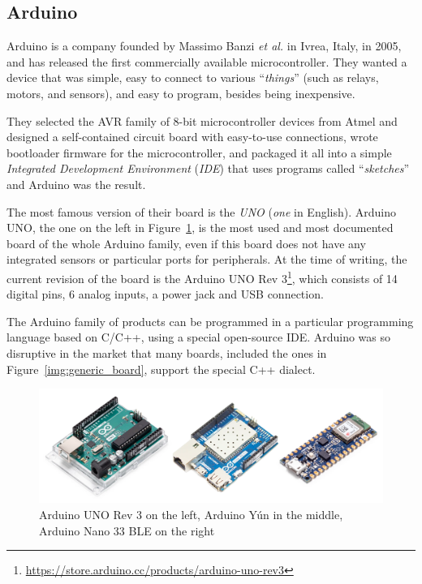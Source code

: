 		\subsection{Arduino}\label{subsec:arduino}
		
			Arduino is a company founded by Massimo Banzi \textit{et al.} in Ivrea, Italy, in 2005, and has released the first commercially available microcontroller.
			They wanted a device that was simple, easy to connect to various ``\textit{things}'' (such as relays, motors, and sensors), and easy to program, besides being inexpensive.
		
			They selected the AVR family of 8-bit microcontroller devices from Atmel and designed a self-contained circuit board with easy-to-use connections, wrote bootloader firmware for the microcontroller, and packaged it all into a simple \textit{Integrated Development Environment} (\textit{IDE}) that uses programs called ``\textit{sketches}'' and Arduino was the result.
			
			The most famous version of their board is the \textit{UNO} (\textit{one} in English).
			Arduino UNO, the one on the left in Figure~\ref{img:arduino_board}, is the most used and most documented board of the whole Arduino family, even if this board does not have any integrated sensors or particular ports for peripherals.
			At the time of writing, the current revision of the board is the Arduino UNO Rev 3\footnote{ \url{https://store.arduino.cc/products/arduino-uno-rev3}}, which consists of 14 digital pins, 6 analog inputs, a power jack and USB connection.
			
			The Arduino family of products can be programmed in a particular programming language based on C/C++, using a special open-source IDE.
			Arduino was so disruptive in the market that many boards, included the ones in Figure~\ref{img:generic_board}, support the special C++ dialect.
			
			\begin{figure}[H]
				\centering
				\includegraphics[width=\textwidth]{resources/img/chap3/arduino_types}
				\caption{Arduino UNO Rev 3 on the left, Arduino Yún in the middle, Arduino Nano 33 BLE on the right}
				\label{img:arduino_board}
			\end{figure}
	
